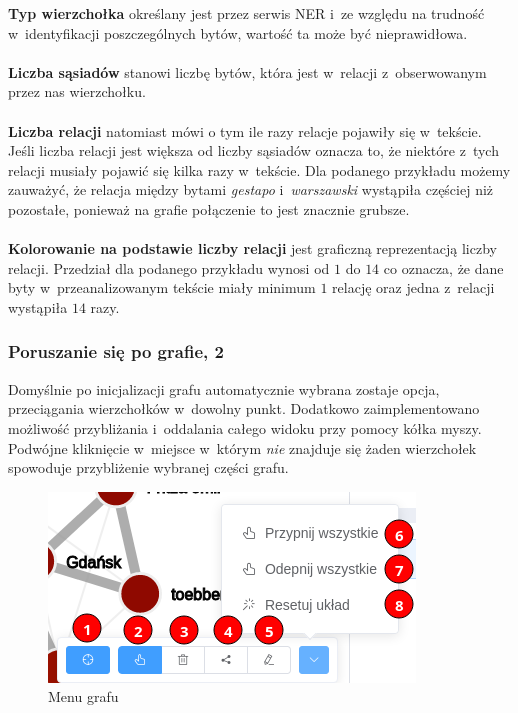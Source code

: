 \documentclass[12pt, a4paper]{article}
\begin{document}
\noindent\textbf{Typ wierzchołka} określany jest przez serwis NER i~ze względu na trudność w~identyfikacji poszczególnych bytów, wartość ta może być nieprawidłowa.\\\\
\textbf{Liczba sąsiadów} stanowi liczbę bytów, która jest w~relacji z~obserwowanym przez nas wierzchołku.\\\\
\textbf{Liczba relacji} natomiast mówi o tym ile razy relacje pojawiły się w~tekście. Jeśli liczba relacji jest większa od liczby sąsiadów oznacza to, że niektóre z~tych relacji musiały pojawić się kilka razy w~tekście. Dla podanego przykładu możemy zauważyć, że relacja między bytami \textit{gestapo} i~\textit{warszawski} wystąpiła częściej niż pozostałe, ponieważ na grafie połączenie to jest znacznie grubsze.\\\\
\textbf{Kolorowanie na podstawie liczby relacji} jest graficzną reprezentacją liczby relacji. Przedział dla podanego przykładu wynosi od $1$ do $14$ co oznacza, że dane byty w~przeanalizowanym tekście miały minimum $1$ relację oraz jedna z~relacji wystąpiła $14$ razy.

\subsubsection{Poruszanie się po grafie, 2}\label{graph-movement}

Domyślnie po inicjalizacji grafu automatycznie wybrana zostaje opcja, przeciągania wierzchołków w~dowolny punkt. Dodatkowo zaimplementowano możliwość przybliżania i~oddalania całego widoku przy pomocy kółka myszy. Podwójne kliknięcie w~miejsce w~którym \textit{nie} znajduje się żaden wierzchołek spowoduje przybliżenie wybranej części grafu.

\begin{figure}[H]
  \centering
  \includegraphics[width=\linewidth]{images/graph-menu.png}
  \caption{Menu grafu}
  \label{graph-menu}
\end{figure}
\end{document}
